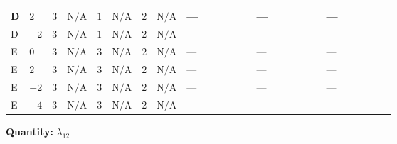 \documentclass[8pt]{article}
\begin{document}
\begin{landscape}
\begin{longtable}{@{}llcccccc >{\raggedright\arraybackslash}p{0.21\linewidth} >{\raggedright\arraybackslash}p{0.21\linewidth} >{\raggedright\arraybackslash}p{0.21\linewidth}@{}}
\midrule
D & $2$ & $3$ & $\text{N/A}$ & $1$ & $\text{N/A}$ & $2$ & $\text{N/A}$ & --- & --- & --- \\
\midrule
D & $-2$ & $3$ & $\text{N/A}$ & $1$ & $\text{N/A}$ & $2$ & $\text{N/A}$ & --- & --- & --- \\
\midrule
E & $0$ & $3$ & $\text{N/A}$ & $3$ & $\text{N/A}$ & $2$ & $\text{N/A}$ & --- & --- & --- \\
\midrule
E & $2$ & $3$ & $\text{N/A}$ & $3$ & $\text{N/A}$ & $2$ & $\text{N/A}$ & --- & --- & --- \\
\midrule
E & $-2$ & $3$ & $\text{N/A}$ & $3$ & $\text{N/A}$ & $2$ & $\text{N/A}$ & --- & --- & --- \\
\midrule
E & $-4$ & $3$ & $\text{N/A}$ & $3$ & $\text{N/A}$ & $2$ & $\text{N/A}$ & --- & --- & --- \\
\midrule
\bottomrule
\end{longtable}
\clearpage
\noindent\textbf{Quantity: }$\lambda_{12}$\par\smallskip

\end{landscape}
\end{document}
